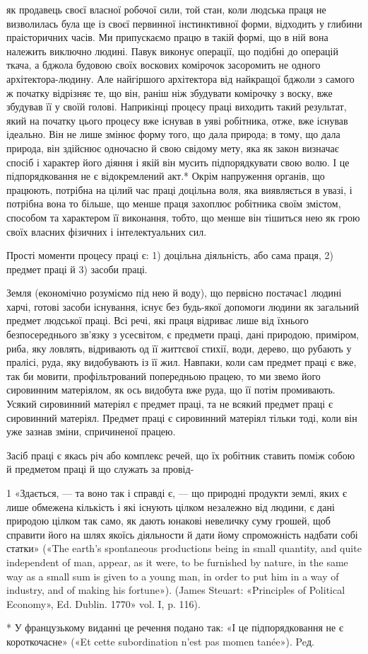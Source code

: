 як продавець своєї власної робочої сили, той стан, коли людська
праця не визволилась була ще із своєї первинної інстинктивної
форми, відходить у глибини праісторичних часів. Ми припускаємо
працю в такій формі, що в ній вона належить виключно людині.
Павук виконує операції, що подібні до операцій ткача, а бджола
будовою своїх воскових комірочок засоромить не одного архітектора-людину.
Але найгіршого архітектора від найкращої
бджоли з самого ж початку відрізняє те, що він, раніш ніж збудувати
комірочку з воску, вже збудував її у своїй голові. Наприкінці
процесу праці виходить такий результат, який на початку
цього процесу вже існував в уяві робітника, отже, вже
існував ідеально. Він не лише змінює форму того, що дала природа;
в тому, що дала природа, він здійснює одночасно й свою
свідому мету, яка як закон визначає спосіб і характер його діяння
і якій він мусить підпорядкувати свою волю. І це підпорядковання
не є відокремлений акт.* Окрім напруження органів, що працюють,
потрібна на цілий час праці доцільна воля, яка виявляється
в увазі, і потрібна вона то більше, що менше праця захоплює
робітника своїм змістом, способом та характером її виконання,
тобто, що менше він тішиться нею як грою своїх власних
фізичних і інтелектуальних сил.

Прості моменти процесу праці є: 1) доцільна діяльність, або
сама праця, 2) предмет праці й 3) засоби праці.

Земля (економічно розуміємо під нею й воду), що первісно
постачає1 людині харчі, готові засоби існування, існує без будь-якої
допомоги людини як загальний предмет людської праці.
Всі речі, які праця відриває лише від їхнього безпосереднього
зв’язку з усесвітом, є предмети праці, дані природою, приміром,
риба, яку ловлять, відривають од її життєвої стихії, води, дерево,
що рубають у пралісі, руда, яку видобувають із її жил. Навпаки, коли
сам предмет праці є вже, так би мовити, профільтрований
попередньою працею, то ми звемо його сировинним матеріялом,
як ось видобута вже руда, що її потім промивають. Усякий сировинний
матеріял є предмет праці, та не всякий предмет праці є
сировинний матеріял. Предмет праці є сировинний матеріял тільки
тоді, коли він уже зазнав зміни, спричиненої працею.

Засіб праці є якась річ або комплекс речей, що їх робітник
ставить поміж собою й предметом праці й що служать за провід-

1 «Здається, — та воно так і справді є, — що природні продукти
землі, яких є лише обмежена кількість і які існують цілком незалежно
від людини, є дані природою цілком так само, як дають юнакові невеличку
суму грошей, щоб справити його на шлях якоїсь діяльности й дати йому
спроможність надбати собі статки» («The earth’s spontaneous productions
being in small quantity, and quite independent of man, appear,
as it were, to be furnished by nature, in the same way as a small sum is given
to a young man, in order to put him in a way of industry, and of making
his fortune»). (James Steuart: «Principles of Political Economy», Ed.
Dublin. 1770» vol. I, p. 116).

* У французькому виданні це речення подано так: «І це підпорядковання
не є короткочасне» («Et cette subordination n’est pas momen
tanée»). Peд.
